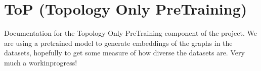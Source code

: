 \documentclass[letterpaper,10pt,english]{sphinxhowto}
\begin{document}
\begin{fulllineitems}
\label{\detokenize{datasets:datasets.get_test_datasets}}
\pysigstartsignatures
{}
\pysigstopsignatures
\end{fulllineitems}


\begin{fulllineitems}
\label{\detokenize{datasets:datasets.get_train_datasets}}
\pysigstartsignatures
{}
\pysigstopsignatures
\end{fulllineitems}


\begin{fulllineitems}
\label{\detokenize{datasets:datasets.get_val_datasets}}
\pysigstartsignatures
{}
\pysigstopsignatures
\end{fulllineitems}



\section{ToP (Topology Only Pre\sphinxhyphen{}Training)}
\label{\detokenize{index:top-topology-only-pre-training}}
\sphinxAtStartPar
Documentation for the Topology Only Pre\sphinxhyphen{}Training component of the project.
We are using a pre\sphinxhyphen{}trained model to generate embeddings of the graphs in the datasets, hopefully to get some measure of how diverse the datasets are.
Very much a work\sphinxhyphen{}in\sphinxhyphen{}progress!
\end{document}
